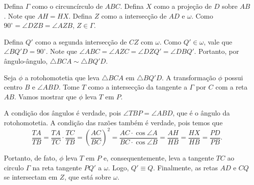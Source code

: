 Defina $\Gamma$ como o circuncírculo de $ABC$.
Defina $X$ como a projeção de $D$ sobre $AB$. Note que $AH = HX$.
Defina $Z$ como a intersecção de $AD$ e $\omega$. Como $90^\circ = \angle DZB = \angle AZB$,  $Z \in \Gamma$.

Defina $Q'$ como a segunda intersecção de $CZ$ com $\omega$. Como $Q' \in \omega$, vale que $\angle BQ'D = 90^\circ$. Note que $\angle ABC = \angle AZC = \angle DZQ' = \angle DBQ'$. Portanto, por ângulo-ângulo, $\triangle BCA \sim \triangle BQ'D$.

Seja $\phi$ a rotohomotetia que leva $\triangle BCA$ em $\triangle BQ'D$. A transformação $\phi$ possui centro $B$ e $\angle ABD$. 
Tome $T$ como a intersecção da tangente a $\Gamma$ por $C$ com a reta $AB$. Vamos mostrar que $\phi$ leva $T$ em $P$.

A condição dos ângulos é verdade, pois $\angle TBP = \angle ABD$, que é o ângulo da rotohomotetia.
A condição das razões também é verdade, pois temos que  \[
	\frac{TA}{TB} = \frac{TA}{TC}\cdot\frac{TC}{TB} = \left(\frac{AC}{BC}\right)^2 = \frac{AC\cdot\cos\angle A}{BC\cdot\cos\angle B} = \frac{AH}{HB} = \frac{HX}{HB} = \frac{PD}{PB}.
\]

Portanto, de fato, $\phi$ leva $T$ em $P$ e, consequentemente, leva a tangente $TC$ ao circulo $\Gamma$ na reta tangente $PQ'$ a $\omega$. Logo, $Q' \equiv Q$.  
Finalmente, as retas $AD$ e $CQ$ se intersectam em $Z$, que está sobre $\omega$.
